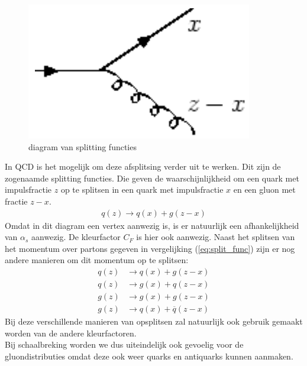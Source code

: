 \documentclass[../main.tex]{subfiles}
\begin{document}
\begin{figure}
    \centering
    \includegraphics[width=0.9\linewidth]{QCD/split_func.png}
    \caption{diagram van splitting functies}
    \label{fig:split_func}
\end{figure}
In QCD is het mogelijk om deze afsplitsing verder uit te werken. Dit zijn de zogenaamde splitting functies. Die geven de waarschijnlijkheid om een quark met impulsfractie $z$ op te splitsen in een quark met impulsfractie $x$ en een gluon met fractie $z-x$.
\begin{equation}
    \begin{aligned}
        \label{eq:split_func}
        q(z)\rightarrow q(x) + g(z-x)
    \end{aligned}
\end{equation}
Omdat in dit diagram een vertex aanwezig is, is er natuurlijk een afhankelijkheid van $\alpha_s$ aanwezig. De kleurfactor $C_F$ is hier ook aanwezig. Naast het splitsen van het momentum over partons gegeven in vergelijking (\ref{eq:split_func}) zijn er nog andere manieren om dit momentum op te splitsen:
\begin{equation}
    \begin{aligned}
        \label{eq:split_func_all}
        q(z)&\rightarrow q(x) + g(z-x)\\
        q(z)&\rightarrow g(x) + q(z-x)\\
        g(z)&\rightarrow g(x) + g(z-x)\\
        g(z)&\rightarrow q(x) + \overline q(z-x)
    \end{aligned}
\end{equation}
Bij deze verschillende manieren van opsplitsen zal natuurlijk ook gebruik gemaakt worden van de andere kleurfactoren.\\
Bij schaalbreking worden we dus uiteindelijk ook gevoelig voor de gluondistributies omdat deze ook weer quarks en antiquarks kunnen aanmaken.
\end{document}
